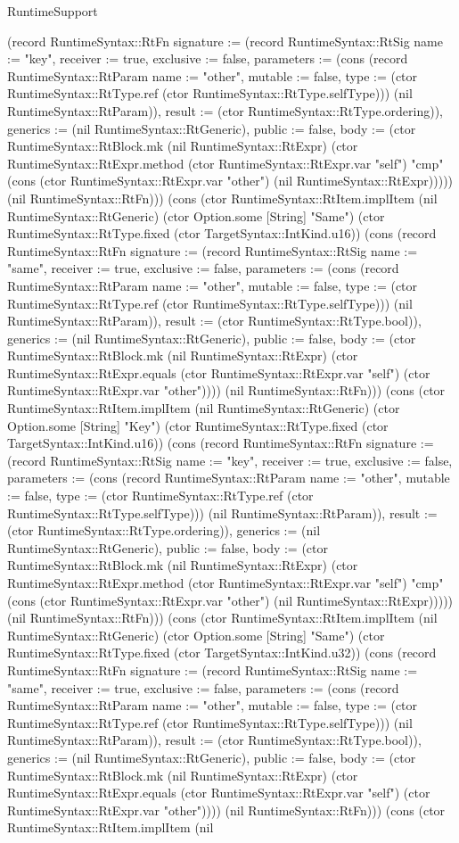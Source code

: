 \begin{lexlean}{RuntimeSupport}
\begin{semanticmodule}
{(record RuntimeSyntax::RtFn {signature := (record RuntimeSyntax::RtSig {name := "key", receiver := true, exclusive := false, parameters := (cons (record RuntimeSyntax::RtParam {name := "other", mutable := false, type := (ctor RuntimeSyntax::RtType.ref (ctor RuntimeSyntax::RtType.selfType))}) (nil RuntimeSyntax::RtParam)), result := (ctor RuntimeSyntax::RtType.ordering)}), generics := (nil RuntimeSyntax::RtGeneric), public := false, body := (ctor RuntimeSyntax::RtBlock.mk (nil RuntimeSyntax::RtExpr) (ctor RuntimeSyntax::RtExpr.method (ctor RuntimeSyntax::RtExpr.var "self") "cmp" (cons (ctor RuntimeSyntax::RtExpr.var "other") (nil RuntimeSyntax::RtExpr))))}) (nil RuntimeSyntax::RtFn))) (cons (ctor RuntimeSyntax::RtItem.implItem (nil RuntimeSyntax::RtGeneric) (ctor Option.some [String] "Same") (ctor RuntimeSyntax::RtType.fixed (ctor TargetSyntax::IntKind.u16)) (cons (record RuntimeSyntax::RtFn {signature := (record RuntimeSyntax::RtSig {name := "same", receiver := true, exclusive := false, parameters := (cons (record RuntimeSyntax::RtParam {name := "other", mutable := false, type := (ctor RuntimeSyntax::RtType.ref (ctor RuntimeSyntax::RtType.selfType))}) (nil RuntimeSyntax::RtParam)), result := (ctor RuntimeSyntax::RtType.bool)}), generics := (nil RuntimeSyntax::RtGeneric), public := false, body := (ctor RuntimeSyntax::RtBlock.mk (nil RuntimeSyntax::RtExpr) (ctor RuntimeSyntax::RtExpr.equals (ctor RuntimeSyntax::RtExpr.var "self") (ctor RuntimeSyntax::RtExpr.var "other")))}) (nil RuntimeSyntax::RtFn))) (cons (ctor RuntimeSyntax::RtItem.implItem (nil RuntimeSyntax::RtGeneric) (ctor Option.some [String] "Key") (ctor RuntimeSyntax::RtType.fixed (ctor TargetSyntax::IntKind.u16)) (cons (record RuntimeSyntax::RtFn {signature := (record RuntimeSyntax::RtSig {name := "key", receiver := true, exclusive := false, parameters := (cons (record RuntimeSyntax::RtParam {name := "other", mutable := false, type := (ctor RuntimeSyntax::RtType.ref (ctor RuntimeSyntax::RtType.selfType))}) (nil RuntimeSyntax::RtParam)), result := (ctor RuntimeSyntax::RtType.ordering)}), generics := (nil RuntimeSyntax::RtGeneric), public := false, body := (ctor RuntimeSyntax::RtBlock.mk (nil RuntimeSyntax::RtExpr) (ctor RuntimeSyntax::RtExpr.method (ctor RuntimeSyntax::RtExpr.var "self") "cmp" (cons (ctor RuntimeSyntax::RtExpr.var "other") (nil RuntimeSyntax::RtExpr))))}) (nil RuntimeSyntax::RtFn))) (cons (ctor RuntimeSyntax::RtItem.implItem (nil RuntimeSyntax::RtGeneric) (ctor Option.some [String] "Same") (ctor RuntimeSyntax::RtType.fixed (ctor TargetSyntax::IntKind.u32)) (cons (record RuntimeSyntax::RtFn {signature := (record RuntimeSyntax::RtSig {name := "same", receiver := true, exclusive := false, parameters := (cons (record RuntimeSyntax::RtParam {name := "other", mutable := false, type := (ctor RuntimeSyntax::RtType.ref (ctor RuntimeSyntax::RtType.selfType))}) (nil RuntimeSyntax::RtParam)), result := (ctor RuntimeSyntax::RtType.bool)}), generics := (nil RuntimeSyntax::RtGeneric), public := false, body := (ctor RuntimeSyntax::RtBlock.mk (nil RuntimeSyntax::RtExpr) (ctor RuntimeSyntax::RtExpr.equals (ctor RuntimeSyntax::RtExpr.var "self") (ctor RuntimeSyntax::RtExpr.var "other")))}) (nil RuntimeSyntax::RtFn))) (cons (ctor RuntimeSyntax::RtItem.implItem (nil }
\end{semanticmodule}
\end{lexlean}
